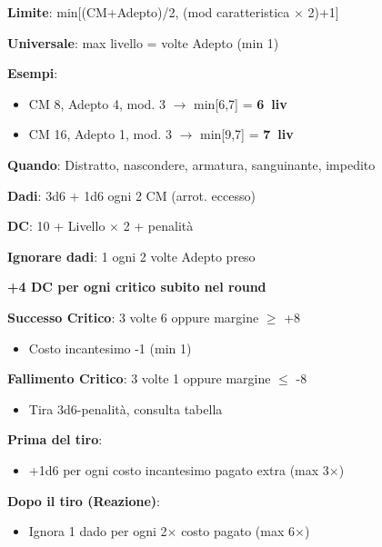 \documentclass[10pt,a4paper,landscape]{article}
\begin{document}
\begin{multicols}{3}
\begin{tcolorbox}[title=MASSIMO LIVELLO INCANTESIMI]
			\textbf{Limite}: min[(CM+Adepto)/2, (mod caratteristica $\times$ 2)+1]
			
			\textbf{Universale}: max livello = volte Adepto (min 1)
			
			\textbf{Esempi}:
			\begin{itemize}[leftmargin=*,noitemsep]
				\item CM 8, Adepto 4, mod. 3 $\rightarrow$ min[6,7] = \textbf{6\textordmasculine\ liv}
				\item CM 16, Adepto 1, mod. 3 $\rightarrow$ min[9,7] = \textbf{7\textordmasculine\ liv}
			\end{itemize}
		\end{tcolorbox}
		
		\begin{tcolorbox}[title=PROVA DI MAGIA,colback=criticalcolor!10!white]
			\textbf{Quando}: Distratto, nascondere, armatura, sanguinante, impedito
			
			\textbf{Dadi}: 3d6 + 1d6 ogni 2 CM (arrot. eccesso)
			
			\textbf{DC}: 10 + Livello $\times$ 2 + penalità
			
			\textbf{Ignorare dadi}: 1 ogni 2 volte Adepto preso
			
			\textbf{+4 DC per ogni critico subito nel round}
			
			\textcolor{successcolor}{\textbf{Successo Critico}}: 3 volte 6 oppure margine $\geq$ +8
			\begin{itemize}[leftmargin=*,noitemsep]
				\item Costo incantesimo -1 (min 1)
			\end{itemize}
			
			\textcolor{criticalcolor}{\textbf{Fallimento Critico}}: 3 volte 1 oppure margine $\leq$ -8
			\begin{itemize}[leftmargin=*,noitemsep]
				\item Tira 3d6-penalità, consulta tabella
			\end{itemize}
		\end{tcolorbox}
		
		\begin{tcolorbox}[title=POTENZIARE PROVE MAGIA]
			\textbf{Prima del tiro}:
			\begin{itemize}[leftmargin=*,noitemsep]
				\item +1d6 per ogni costo incantesimo pagato extra (max 3$\times$)
			\end{itemize}
			
			\textbf{Dopo il tiro (Reazione)}:
			\begin{itemize}[leftmargin=*,noitemsep]
				\item Ignora 1 dado per ogni 2$\times$ costo pagato (max 6$\times$)
			\end{itemize}
			

\end{tcolorbox}
\end{multicols}
\end{document}
